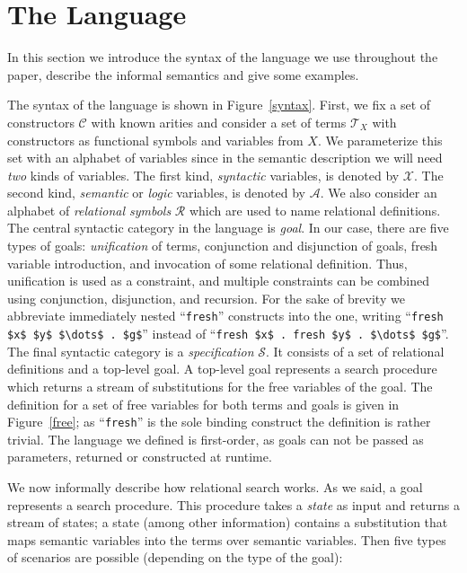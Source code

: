 \section{The Language}
\label{language}
 
In this section we introduce the syntax of the language we use throughout the paper, describe the informal semantics and give some examples.

The syntax of the language is shown in Figure~\ref{syntax}. First, we fix a set of constructors $\mathcal{C}$ with known arities and consider
a set of terms $\mathcal{T}_X$ with constructors as functional symbols and variables from $X$. We parameterize this set with an alphabet of
variables since in the semantic description we will need \emph{two} kinds of variables. The first kind, \emph{syntactic} variables, is denoted
by $\mathcal{X}$. The second kind, \emph{semantic} or \emph{logic} variables, is denoted by $\mathcal{A}$.
We also consider an alphabet of \emph{relational symbols} $\mathcal{R}$ which are used to name relational definitions.
The central syntactic category in the language is \emph{goal}. In our case, there are five types of goals: \emph{unification} of terms,
conjunction and disjunction of goals, fresh variable introduction, and invocation of some relational definition. Thus, unification is used
as a constraint, and multiple constraints can be combined using conjunction, disjunction, and recursion.  {\color{orange} For the sake of brevity we
abbreviate immediately nested ``\lstinline|fresh|'' constructs into the one, writing ``\lstinline|fresh $x$ $y$ $\dots$ . $g$|'' instead of
``\lstinline|fresh $x$ . fresh $y$ . $\dots$ $g$|''.} The final syntactic category is a \emph{specification} $\mathcal{S}$. It consists of a set
of relational definitions and a top-level goal. A top-level goal represents a search procedure which returns a stream of substitutions for
the free variables of the goal. The definition for a set of free variables for both terms and goals is given in Figure~\ref{free}; as ``\lstinline|fresh|''
is the sole binding construct the definition is rather trivial. The language we defined is first-order, as goals can not be passed as parameters,
returned or constructed at runtime.

We now informally describe how relational search works. As we said, a goal represents a search procedure. This procedure takes a \emph{state} as input and returns a
stream of states; a state (among other information) contains a substitution that maps semantic variables into the terms over semantic variables. Then five types of
scenarios are possible (depending on the type of the goal):

